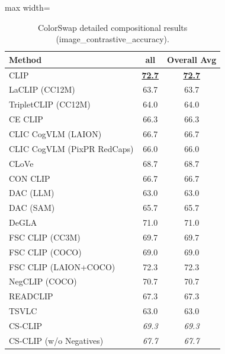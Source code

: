 \begin{table}[t]
  \centering
  \scriptsize
  \caption{ColorSwap detailed compositional results (image_contrastive_accuracy).}
  \label{tab:ColorSwap_detailed}
  \begin{adjustbox}{max width=\textwidth}
  \setlength{\tabcolsep}{2pt}
  \begin{tabular}{p{5cm}c|c}
    \toprule
    Method & all & Overall Avg \\
    \midrule
    CLIP & \underline{\textbf{72.7}} & \underline{\textbf{72.7}} \\
    \midrule
    LaCLIP (CC12M) & 63.7 & 63.7 \\
    TripletCLIP (CC12M) & 64.0 & 64.0 \\
    \midrule
    CE CLIP & 66.3 & 66.3 \\
    CLIC CogVLM (LAION) & 66.7 & 66.7 \\
    CLIC CogVLM (PixPR RedCaps) & 66.0 & 66.0 \\
    CLoVe & 68.7 & 68.7 \\
    CON CLIP & 66.7 & 66.7 \\
    DAC (LLM) & 63.0 & 63.0 \\
    DAC (SAM) & 65.7 & 65.7 \\
    DeGLA & 71.0 & 71.0 \\
    FSC CLIP (CC3M) & 69.7 & 69.7 \\
    FSC CLIP (COCO) & 69.0 & 69.0 \\
    FSC CLIP (LAION+COCO) & 72.3 & 72.3 \\
    NegCLIP (COCO) & 70.7 & 70.7 \\
    READCLIP & 67.3 & 67.3 \\
    TSVLC & 63.0 & 63.0 \\
    \midrule
    CS-CLIP & \emph{69.3} & \emph{69.3} \\
    CS-CLIP (w/o Negatives) & \emph{67.7} & \emph{67.7} \\
    \bottomrule
  \end{tabular}
  \end{adjustbox}
\end{table}

